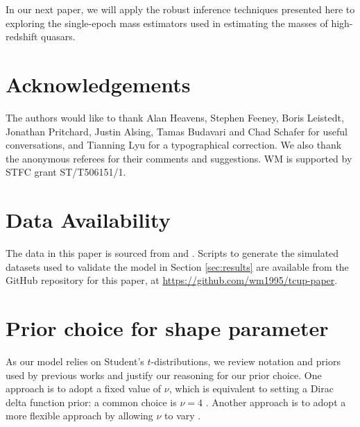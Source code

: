 \documentclass[fleqn,usenatbib]{rasti}
\begin{document}
In our next paper, we will apply the robust inference techniques presented here
to exploring the single-epoch mass estimators used in estimating the masses of
high-redshift quasars.

\section*{Acknowledgements}

The authors would like to thank Alan Heavens, Stephen Feeney, Boris Leistedt,
Jonathan Pritchard, Justin Alsing, Tamas Budavari and Chad Schafer for useful
conversations, and Tianning Lyu for a typographical correction. We also thank
the anonymous referees for their comments and suggestions. WM is supported by
STFC grant ST/T506151/1.

\section*{Data Availability}

The data in this paper is sourced from \citet{Kelly:2007} and \citet{Park:2017}.
Scripts to generate the simulated datasets used to validate the model in Section
\ref{sec:results} are available from the GitHub repository for this paper, at
\url{https://github.com/wm1995/tcup-paper}.







\appendix

\section{Prior choice for shape parameter}
\label{sec:t-prior}

As our model relies on Student's $t$-distributions, we review notation and
priors used by previous works and justify our reasoning for our prior choice.
One approach is to adopt a fixed value of $\nu$, which is equivalent to setting
a Dirac delta function prior: a common choice is $\nu = 4$
\citep[e.g.][]{Berger:1994, Gelman:2013}.  Another approach is to adopt a more
flexible approach by allowing $\nu$ to vary \citep[e.g.][]{Juarez:2010,
Gelman:2013, Ding:2014, Park:2017, Feeney:2018}.
\end{document}
